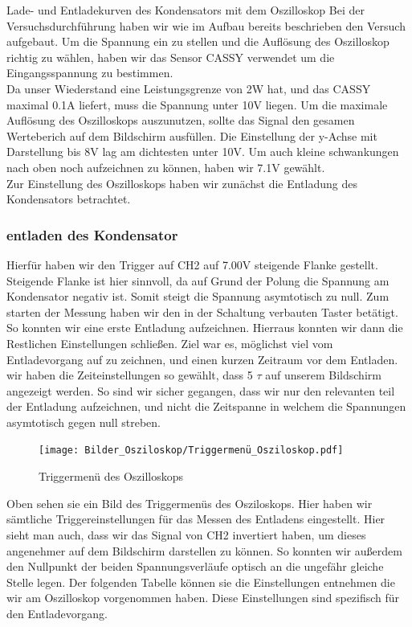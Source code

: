 \documentclass[twoside]{protokoll}
\begin{document}
\begin{aufgabe}{Lade- und Entladekurven des Kondensators mit dem Oszilloskop}
  Bei der Versuchsdurchführung haben wir wie im Aufbau bereits beschrieben den Versuch 
  aufgebaut. Um die Spannung ein zu stellen und die Auflösung des Oszilloskop richtig zu
  wählen, haben wir das Sensor CASSY verwendet um die Eingangsspannung zu bestimmen. \\
  Da unser Wiederstand eine Leistungsgrenze von 2W hat, und das CASSY maximal 0.1A liefert, muss die Spannung unter 10V liegen.
  Um die maximale Auflösung des Oszilloskops auszunutzen, sollte das Signal den gesamen Werteberich auf dem Bildschirm ausfüllen.
  Die Einstellung der y-Achse mit Darstellung bis 8V lag am dichtesten unter 10V. 
  Um auch kleine schwankungen nach oben noch aufzeichnen zu können, haben wir 7.1V gewählt. \\
  Zur Einstellung des Oszilloskops haben wir zunächst die Entladung des Kondensators betrachtet. 
  
  \subsubsection{entladen des Kondensator}
  
  Hierfür haben wir den Trigger auf CH2 auf 7.00V 
   steigende Flanke gestellt. Steigende Flanke ist hier sinnvoll, da auf Grund der Polung 
  die Spannung am Kondensator negativ ist. Somit steigt die Spannung asymtotisch zu null. 
  Zum starten der Messung haben wir den in der Schaltung verbauten Taster betätigt.
  So konnten wir eine erste Entladung aufzeichnen. Hierraus konnten wir dann die Restlichen 
  Einstellungen schließen. Ziel war es, möglichst viel vom Entladevorgang auf zu zeichnen, und 
  einen kurzen Zeitraum vor dem Entladen.
  wir haben die Zeiteinstellungen so gewählt, dass 5 $\tau$ auf unserem Bildschirm angezeigt
  werden. So sind wir sicher gegangen, dass wir nur den relevanten teil der Entladung aufzeichnen, 
  und nicht die Zeitspanne in welchem die Spannungen asymtotisch gegen null streben. 

\begin{figure}[H]
  \centering
    \texttt{[image: Bilder\_Osziloskop/Triggermenü\_Osziloskop.pdf]}
  \caption{Triggermenü des Oszilloskops}
  \centering
\end{figure}

Oben sehen sie ein Bild des Triggermenüs des Osziloskops. Hier haben wir sämtliche Triggereinstellungen für das Messen des Entladens eingestellt.
Hier sieht man auch, dass wir das Signal von CH2 invertiert haben, um dieses angenehmer
auf dem Bildschirm darstellen zu können. So konnten wir außerdem den Nullpunkt der beiden 
Spannungsverläufe optisch an die ungefähr gleiche Stelle legen. Der folgenden Tabelle
können sie die Einstellungen entnehmen die wir am Oszilloskop vorgenommen haben.
Diese Einstellungen sind spezifisch für den Entladevorgang.



\end{aufgabe}
\end{document}
